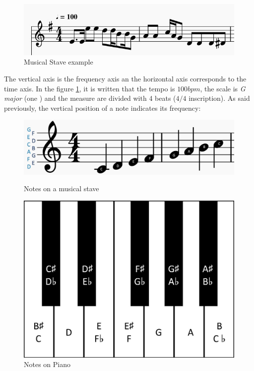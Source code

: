 \documentclass[12pt]{report}
\begin{document}
\begin{figure}[H]
    \centering
    \includegraphics[scale=0.75]{images/music/stave/musical_stave_example.jpg}
    \caption{Musical Stave example}
    \label{fig:musical_stave_example}
\end{figure}

The vertical axis is the frequency axis an the horizontal axis corresponds to the time axis.
In the figure \ref{fig:musical_stave_example}, it is written that the tempo is $100 bpm$, the scale is \textit{G major} (one \musSharp) and the measure are divided with 4 beats ($4/4$ inscription).
As said previously, the vertical position of a note indicates its frequency:

\begin{figure}[H]
   \begin{minipage}{0.5\textwidth}
     \centering
     \includegraphics[width=.9\linewidth]{images/music/stave/note_names.jpg}
     \caption{Notes on a musical stave}
     \label{fig:note_names}
   \end{minipage}\hfill
   \begin{minipage}{0.5\textwidth}
     \centering
     \includegraphics[width=.9\linewidth]{images/music/piano/piano_keys.jpg}
     \caption{Notes on Piano}
     \label{fig:piano_keys}
   \end{minipage}
\end{figure}
\end{document}
